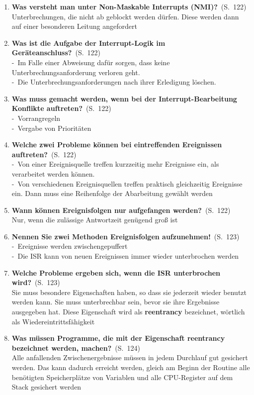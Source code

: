 \documentclass[a4paper,12pt]{article}
\newcommand{\question}[3]{\pagebreak[3]\item {\textbf{#1?}}\ (S.\ #2)#3}
\newcommand{\statement}[3]{\pagebreak[3]\item {\textbf{#1!}}\ (S.\ #2)#3}
\newcommand{\catchword}[1]{\\-\ #1}
\newcommand{\normaltext}[1]{\\#1}
\newcommand{\page}[1]{#1}
\newcommand{\important}[1]{\textbf{#1}}
\begin{document}
\begin{enumerate}
  \question{Was versteht man unter Non-Maskable Interrupts (NMI)}{\page{122}}
  {
    \normaltext{Unterbrechungen, die nicht ab geblockt werden dürfen. Diese werden dann auf einer 
                besonderen Leitung angefordert}
  }

  \question{Was ist die Aufgabe der Interrupt-Logik im Geräteanschluss}{\page{122}}
  {
    \catchword{Im Falle einer Abweisung dafür sorgen, dass keine Unterbrechungsanforderung verloren geht.}
    \catchword{Die Unterbrechungsanforderungen nach ihrer Erledigung löschen.}
  }

  \question{Was muss gemacht werden, wenn bei der Interrupt-Bearbeitung
            Konflikte auftreten}{\page{122}}
  {
    \catchword{Vorrangregeln}
    \catchword{Vergabe von Prioritäten}
  }

  \question{Welche zwei Probleme können bei eintreffenden Ereignissen auftreten}{\page{122}}
  {
    \catchword{Von einer Ereignisquelle treffen kurzzeitig mehr Ereignisse ein,
               als verarbeitet werden können. }
    \catchword{Von verschiedenen Ereignisquellen treffen praktisch gleichzeitig Ereignisse ein.
               Dann muss eine Reihenfolge der Abarbeitung gewählt werden}
  }

  \question{Wann können Ereignisfolgen nur aufgefangen werden}{\page{122}}
  {
    \normaltext{Nur, wenn die zulässige Antwortzeit genügend groß ist}
  }

  \statement{Nennen Sie zwei Methoden Ereignisfolgen aufzunehmen}{\page{123}}
  {
    \catchword{Ereignisse werden zwischengepuffert}
    \catchword{Die ISR kann von neuen Ereignissen immer wieder unterbrochen werden}
  }

  \question{Welche Probleme ergeben sich, wenn die ISR unterbrochen wird}{\page{123}}
  {
    \normaltext{Sie muss besondere Eigenschaften haben, so dass sie jederzeit wieder
                benutzt werden kann. Sie muss unterbrechbar sein, bevor sie ihre
                Ergebnisse ausgegeben hat. Diese Eigenschaft wird als \important{reentrancy}
                bezeichnet, wörtlich als Wiedereintrittsfähigkeit}
  }

  \question{Was müssen Programme, die mit der Eigenschaft reentrancy
            bezeichnet werden, machen}{\page{124}}
  {
    \normaltext{Alle anfallenden Zwischenergebnisse müssen in jedem Durchlauf gut
                gesichert werden. Das kann dadurch erreicht werden, gleich am Beginn
                der Routine alle benötigten Speicherplätze von Variablen und alle
                CPU-Register auf dem Stack gesichert werden}
  }


\end{enumerate}
\end{document}
